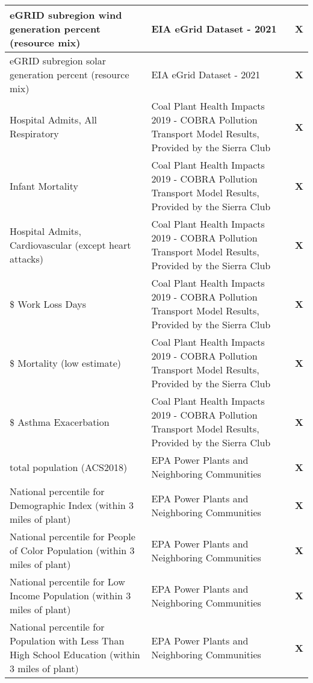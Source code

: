 \begin{table}[H]
\begin{adjustbox}{width=\textwidth}
\begin{tabular}{|l | l | l |}
        \midrule
        eGRID subregion wind generation percent (resource mix) & EIA eGrid Dataset - 2021 & \textbf{X} \\
        \midrule
        eGRID subregion solar generation percent (resource mix) & EIA eGrid Dataset - 2021 & \textbf{X} \\
        \midrule
        Hospital Admits, All Respiratory & Coal Plant Health Impacts 2019 - COBRA Pollution Transport Model Results, Provided by the Sierra Club & \textbf{X} \\
        \midrule
        Infant Mortality & Coal Plant Health Impacts 2019 - COBRA Pollution Transport Model Results, Provided by the Sierra Club & \textbf{X} \\
        \midrule
        Hospital Admits, Cardiovascular (except heart attacks) & Coal Plant Health Impacts 2019 - COBRA Pollution Transport Model Results, Provided by the Sierra Club & \textbf{X} \\
        \midrule
        \$ Work Loss Days & Coal Plant Health Impacts 2019 - COBRA Pollution Transport Model Results, Provided by the Sierra Club & \textbf{X} \\
        \midrule
        \$ Mortality (low estimate) & Coal Plant Health Impacts 2019 - COBRA Pollution Transport Model Results, Provided by the Sierra Club & \textbf{X} \\
        \midrule
        \$ Asthma Exacerbation & Coal Plant Health Impacts 2019 - COBRA Pollution Transport Model Results, Provided by the Sierra Club & \textbf{X} \\
        \midrule
        total population (ACS2018) & EPA Power Plants and Neighboring Communities & \textbf{X} \\
        \midrule
        National percentile for Demographic Index (within 3 miles of plant) & EPA Power Plants and Neighboring Communities & \textbf{X} \\
        \midrule
        National percentile for People of Color Population (within 3 miles of plant) & EPA Power Plants and Neighboring Communities & \textbf{X} \\
        \midrule
        National percentile for Low Income Population (within 3 miles of plant) & EPA Power Plants and Neighboring Communities & \textbf{X} \\
        \midrule
        National percentile for Population with Less Than High School Education (within 3 miles of plant) & EPA Power Plants and Neighboring Communities & \textbf{X} \\
        \midrule

\end{tabular}
\end{adjustbox}
\end{table}
